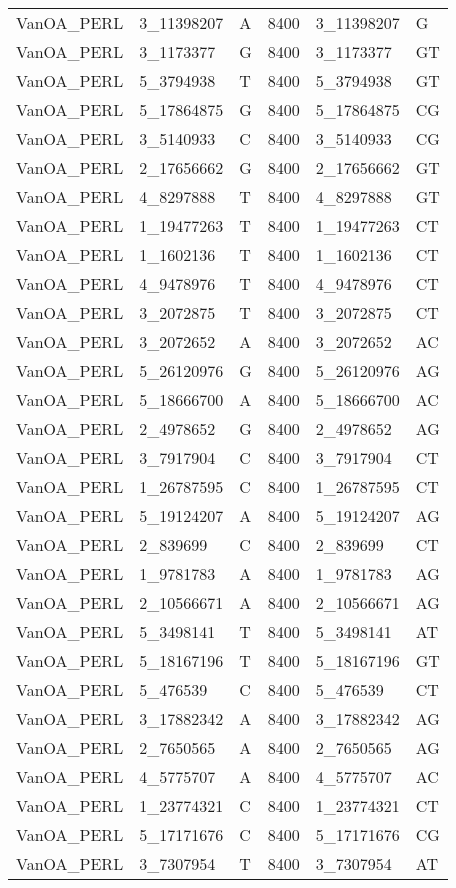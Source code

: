 \begin{center}
\begin{longtable}{|l|l|l|l|l|l|}
VanOA\_PERL&3\_11398207&A&8400&3\_11398207&G\\
VanOA\_PERL&3\_1173377&G&8400&3\_1173377&GT\\
VanOA\_PERL&5\_3794938&T&8400&5\_3794938&GT\\
VanOA\_PERL&5\_17864875&G&8400&5\_17864875&CG\\
VanOA\_PERL&3\_5140933&C&8400&3\_5140933&CG\\
VanOA\_PERL&2\_17656662&G&8400&2\_17656662&GT\\
VanOA\_PERL&4\_8297888&T&8400&4\_8297888&GT\\
VanOA\_PERL&1\_19477263&T&8400&1\_19477263&CT\\
VanOA\_PERL&1\_1602136&T&8400&1\_1602136&CT\\
VanOA\_PERL&4\_9478976&T&8400&4\_9478976&CT\\
VanOA\_PERL&3\_2072875&T&8400&3\_2072875&CT\\
VanOA\_PERL&3\_2072652&A&8400&3\_2072652&AC\\
VanOA\_PERL&5\_26120976&G&8400&5\_26120976&AG\\
VanOA\_PERL&5\_18666700&A&8400&5\_18666700&AC\\
VanOA\_PERL&2\_4978652&G&8400&2\_4978652&AG\\
VanOA\_PERL&3\_7917904&C&8400&3\_7917904&CT\\
VanOA\_PERL&1\_26787595&C&8400&1\_26787595&CT\\
VanOA\_PERL&5\_19124207&A&8400&5\_19124207&AG\\
VanOA\_PERL&2\_839699&C&8400&2\_839699&CT\\
VanOA\_PERL&1\_9781783&A&8400&1\_9781783&AG\\
VanOA\_PERL&2\_10566671&A&8400&2\_10566671&AG\\
VanOA\_PERL&5\_3498141&T&8400&5\_3498141&AT\\
VanOA\_PERL&5\_18167196&T&8400&5\_18167196&GT\\
VanOA\_PERL&5\_476539&C&8400&5\_476539&CT\\
VanOA\_PERL&3\_17882342&A&8400&3\_17882342&AG\\
VanOA\_PERL&2\_7650565&A&8400&2\_7650565&AG\\
VanOA\_PERL&4\_5775707&A&8400&4\_5775707&AC\\
VanOA\_PERL&1\_23774321&C&8400&1\_23774321&CT\\
VanOA\_PERL&5\_17171676&C&8400&5\_17171676&CG\\
VanOA\_PERL&3\_7307954&T&8400&3\_7307954&AT\\

\end{longtable}
\end{center}

